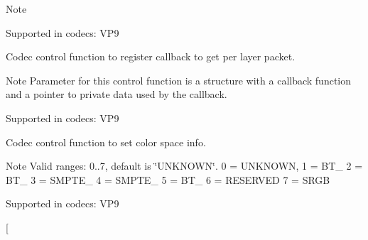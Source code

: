 \begin{Desc}
\begin{description}
\begin{DoxyNote}{Note}
\end{DoxyNote}
Supported in codecs\+: V\+P9 \item[{\em 
V\+P9\+E\+\_\+\+R\+E\+G\+I\+S\+T\+E\+R\+\_\+\+C\+X\+\_\+\+C\+A\+L\+L\+B\+A\+CK\hypertarget{group__vp8__encoder_gga6deae3d561c838952552c3d3756322eca4a8cf2d34935d9d7e05149fd19673dd7}{}\label{group__vp8__encoder_gga6deae3d561c838952552c3d3756322eca4a8cf2d34935d9d7e05149fd19673dd7}
}]Codec control function to register callback to get per layer packet. \begin{DoxyNote}{Note}
Parameter for this control function is a structure with a callback function and a pointer to private data used by the callback.
\end{DoxyNote}
Supported in codecs\+: V\+P9 \item[{\em 
V\+P9\+E\+\_\+\+S\+E\+T\+\_\+\+C\+O\+L\+O\+R\+\_\+\+S\+P\+A\+CE\hypertarget{group__vp8__encoder_gga6deae3d561c838952552c3d3756322ecab67a3db9b16d938513d1ee6a69b24e02}{}\label{group__vp8__encoder_gga6deae3d561c838952552c3d3756322ecab67a3db9b16d938513d1ee6a69b24e02}
}]Codec control function to set color space info. \begin{DoxyNote}{Note}
Valid ranges\+: 0..7, default is \char`\"{}\+U\+N\+K\+N\+O\+W\+N\char`\"{}. 0 = U\+N\+K\+N\+O\+WN, 1 = B\+T\+\_ 2 = B\+T\+\_ 3 = S\+M\+P\+T\+E\+\_ 4 = S\+M\+P\+T\+E\+\_ 5 = B\+T\+\_ 6 = R\+E\+S\+E\+R\+V\+ED 7 = S\+R\+GB
\end{DoxyNote}
Supported in codecs\+: V\+P9 \item[{\em 
}
\end{description}
\end{Desc}
